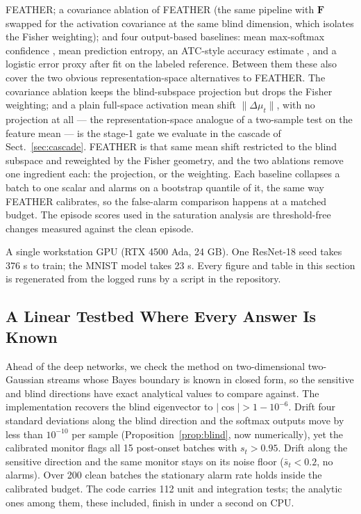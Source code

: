 \documentclass[graybox]{SNmult}
\newcommand{\F}{\mathbf{F}}
\begin{document}
FEATHER; a covariance ablation of FEATHER (the same pipeline with $\F$
swapped for the activation covariance at the same blind dimension, which
isolates the Fisher weighting); and four output-based baselines: mean
max-softmax confidence \cite{hendrycks2017baseline}, mean prediction entropy,
an ATC-style accuracy estimate \cite{garg2022atc}, and a logistic error proxy
after \cite{amoukou2024sequential} fit on the labeled reference. Between them
these also cover the two obvious representation-space alternatives to FEATHER.
The covariance ablation keeps the blind-subspace projection but drops the Fisher
weighting; and a plain full-space activation mean shift
$\lVert\Delta\mu_t\rVert$, with no projection at all --- the representation-space
analogue of a two-sample test on the feature mean --- is the stage-1 gate we
evaluate in the cascade of Sect.~\ref{sec:cascade}. FEATHER is that same mean
shift restricted to the blind subspace and reweighted by the Fisher geometry,
and the two ablations remove one ingredient each: the projection, or the
weighting. Each baseline collapses a batch to one scalar and alarms on a
bootstrap quantile of it, the same way FEATHER calibrates, so the false-alarm
comparison happens at a matched budget. The episode scores used in the saturation analysis are
threshold-free changes measured against the clean episode.

A single workstation GPU (RTX 4500 Ada, 24 GB). One ResNet-18 seed takes
376 s to train; the MNIST model takes 23 s. Every figure and table in this
section is regenerated from the logged runs by a script in the repository.

\subsection{A Linear Testbed Where Every Answer Is Known}

Ahead of the deep networks, we check the method on two-dimensional
two-Gaussian streams whose Bayes boundary is known in closed form, so the
sensitive and blind directions have exact analytical values to compare
against. The implementation recovers the blind eigenvector to
$|\cos| > 1 - 10^{-6}$. Drift four standard deviations along the blind
direction and the softmax outputs move by less than $10^{-10}$ per sample
(Proposition~\ref{prop:blind}, now numerically), yet the calibrated monitor
flags all 15 post-onset batches with $s_t > 0.95$. Drift along the sensitive
direction and the same monitor stays on its noise floor ($\bar{s}_t < 0.2$,
no alarms). Over 200 clean batches the stationary alarm rate holds inside the
calibrated budget. The code carries 112 unit and integration tests; the
analytic ones among them, these included, finish in under a second on CPU.
\end{document}
